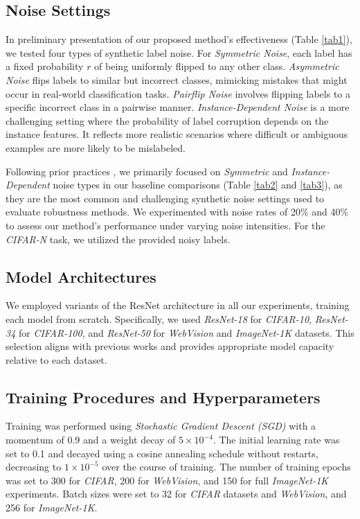 \subsection{Noise Settings}

In preliminary presentation of our proposed method's effectiveness (Table \ref{tab1}), we tested four types of synthetic label noise. For \emph{Symmetric Noise}, each label has a fixed probability $r$ of being uniformly flipped to any other class.
\emph{Asymmetric Noise} flips labels to similar but incorrect classes, mimicking mistakes that might occur in real-world classification tasks. 
\emph{Pairflip Noise} involves flipping labels to a specific incorrect class in a pairwise manner.
\emph{Instance-Dependent Noise} \cite{xia2020part} is a more challenging setting where the probability of label corruption depends on the instance features. It reflects more realistic scenarios where difficult or ambiguous examples are more likely to be mislabeled.

Following prior practices \cite{bai2021me, yuan2023late}, we primarily focused on \emph{Symmetric} and \emph{Instance-Dependent} noise types in our baseline comparisons (Table \ref{tab2} and \ref{tab3}), as they are the most common and challenging synthetic noise settings used to evaluate robustness methods. We experimented with noise rates of 20\% and 40\% to assess our method's performance under varying noise intensities. 
For the \emph{CIFAR-N} task, we utilized the provided noisy labels.

\subsection{Model Architectures}

We employed variants of the ResNet architecture \cite{he2016deep} in all our experiments, training each model from scratch. Specifically, we used \emph{ResNet-18} for \emph{CIFAR-10}, \emph{ResNet-34} for \emph{CIFAR-100}, and \emph{ResNet-50} for \emph{WebVision} and \emph{ImageNet-1K} datasets. This selection aligns with previous works and provides appropriate model capacity relative to each dataset.

\subsection{Training Procedures and Hyperparameters}

Training was performed using \emph{Stochastic Gradient Descent (SGD)} with a momentum of 0.9 and a weight decay of $5 \times 10^{-4}$. The initial learning rate was set to 0.1 and decayed using a cosine annealing schedule without restarts, decreasing to $1 \times 10^{-5}$ over the course of training. 
The number of training epochs was set to 300 for \emph{CIFAR}, 200 for \emph{WebVision}, and 150 for full \emph{ImageNet-1K} experiments. Batch sizes were set to 32 for \emph{CIFAR} datasets and \emph{WebVision}, and 256 for \emph{ImageNet-1K}.


